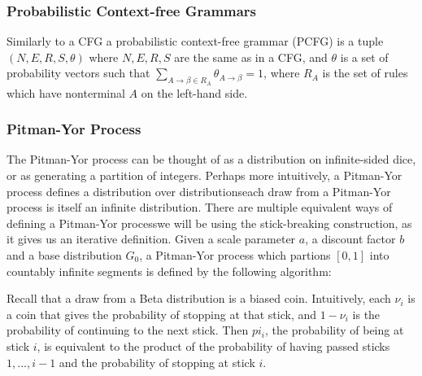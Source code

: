 \documentclass[12pt,letterpaper]{article}
\begin{document}
\subsubsection{Probabilistic Context-free Grammars}
Similarly to a CFG a probabilistic context-free grammar (PCFG) is a tuple $(N, E, R, S, \theta)$ where $N,E,R,S$ are the same as in a CFG, and $\theta$ is a set of probability vectors such that $\sum\limits_{A\rightarrow \beta \in R_A} \theta_{A\rightarrow \beta} = 1$, where $R_A$ is the set of rules which have nonterminal $A$ on the left-hand side. 

\subsubsection{Pitman-Yor Process}
The Pitman-Yor process \citep{pitman:1997} can be thought of as a distribution on infinite-sided dice, or as generating a partition of integers. Perhaps more intuitively, a Pitman-Yor process defines a distribution over distributions\textemdash each draw from a Pitman-Yor process is itself an infinite distribution. There are multiple equivalent ways of defining a Pitman-Yor process\textemdash we will be using the stick-breaking construction, as it gives us an iterative definition. Given a scale parameter $a$, a discount factor $b$ and a base distribution $G_0$, a Pitman-Yor process which partions $[0,1]$ into countably infinite segments is defined by the following algorithm:
\begin{figure}[H]
\end{figure}
Recall that a draw from a Beta distribution is a biased coin. Intuitively, each $\nu_i$ is a coin that gives the probability of stopping at that stick, and $1-\nu_i$ is the probability of continuing to the next stick. Then $pi_i$, the probability of being at stick $i$, is equivalent to the product of the probability of having passed sticks $1,...,i-1$ and the probability of stopping at stick $i$. 
\end{document}
